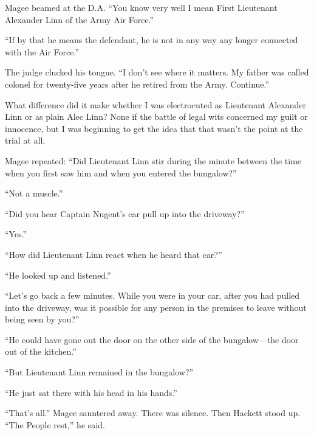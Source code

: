 \documentclass{novel}
\begin{document}
Magee beamed at the D.A. “You know very well I mean First Lieutenant Alexander Linn of the Army Air Force.”

“If by that he means the defendant, he is not in any way any longer connected with the Air Force.”

The judge clucked his tongue. “I don’t see where it matters. My father was called colonel for twenty-five years after he retired from the Army. Continue.”

What difference did it make whether I was electrocuted as Lieutenant Alexander Linn or as plain Alec Linn? None if the battle of legal wits concerned my guilt or innocence, but I was beginning to get the idea that that wasn’t the point at the trial at all.

Magee repeated: “Did Lieutenant Linn stir during the minute between the time when you first saw him and when you entered the bungalow?”

“Not a muscle.”

“Did you hear Captain Nugent’s car pull up into the driveway?”

“Yes.”

“How did Lieutenant Linn react when he heard that car?”

“He looked up and listened.”

“Let’s go back a few minutes. While you were in your car, after you had pulled into the driveway, was it possible for any person in the premises to leave without being seen by you?”

“He could have gone out the door on the other side of the bungalow—the door out of the kitchen.”

“But Lieutenant Linn remained in the bungalow?”

“He just sat there with his head in his hands.”

“That’s all.” Magee sauntered away. There was silence. Then Hackett stood up. “The People rest,” he said.

\vspace{2\nbs}
\clearpage
\thispagestyle{empty}


\begin{ChapterStart}
\vspace{3\nbs}
\end{ChapterStart}
\end{document}
